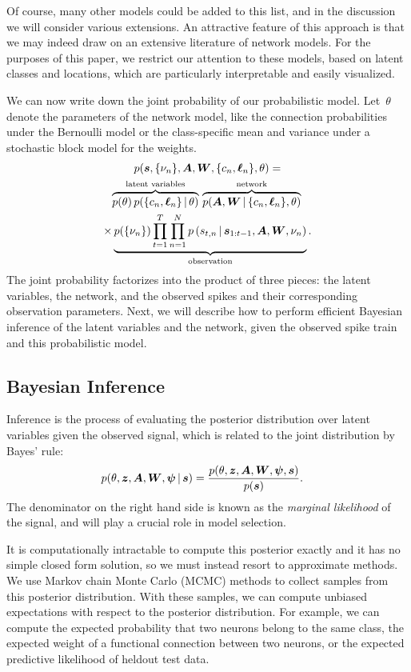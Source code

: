 Of course, many other models could be added to this list, and in the
discussion we will consider various extensions. An attractive feature
of this approach is that we may indeed draw on an extensive literature
of network models. For the purposes of this paper, we restrict our
attention to these models, based on latent classes and locations,
which are particularly interpretable and easily visualized.

We can now write down the joint probability of our probabilistic model.
Let~$\theta$ denote the parameters of the network model, like the connection
probabilities under the Bernoulli model or the class-specific mean and variance
under a stochastic block model for the weights. 
\begin{multline}
p(\boldsymbol{s}, \{\nu_n\}, \boldsymbol{A}, \boldsymbol{W}, \{c_n, \boldsymbol{\ell}_n\}, \theta) 
=  \\
\overbrace{p(\theta) \, p(\{c_n, \boldsymbol{\ell}_n\} \,|\, \theta)}^\text{latent variables} \, 
\overbrace{p(\boldsymbol{A}, \boldsymbol{W} \,|\, \{c_n, \boldsymbol{\ell}_n\}, \theta)}^\text{network} \, \\
\times \underbrace{ p(\{\nu_n\}) \prod_{t=1}^T  \prod_{n=1}^N  p \left(s_{t,n} \,|\, \boldsymbol{s}_{1:t-1}, \boldsymbol{A}, \boldsymbol{W}, \nu_n \right) }_\text{observation} .
\end{multline}
The joint probability
factorizes into the product of three pieces: the latent variables, the network, and the observed spikes and their corresponding observation parameters. Next, we will describe
how to perform efficient Bayesian inference of the latent variables
and the network, given the observed spike train and this probabilistic model.

\subsection{Bayesian Inference}
Inference is the process of evaluating the posterior distribution over latent variables given the observed signal, which is related to the joint distribution by Bayes' rule:
\begin{align}
p(\theta, \boldsymbol{z}, \boldsymbol{A}, \boldsymbol{W}, \boldsymbol{\psi} \,|\, \boldsymbol{s}) &= \frac{p(\theta, \boldsymbol{z}, \boldsymbol{A}, \boldsymbol{W}, \boldsymbol{\psi}, \boldsymbol{s}) }{p(\boldsymbol{s})}.
\end{align}
The denominator on the right hand side is known as the \emph{marginal likelihood} of the signal, and will play a crucial role in model selection. 

It is computationally intractable to compute this posterior exactly and it has no simple closed form solution, so we must instead resort to approximate methods. 
We use Markov chain Monte Carlo (MCMC) methods to collect samples from this posterior distribution.
With these samples, we can compute unbiased expectations with respect to the posterior distribution.
For example, we can compute the expected probability that two neurons belong to the same class, the expected weight of a functional connection between two neurons, or the expected predictive likelihood of heldout test data.


